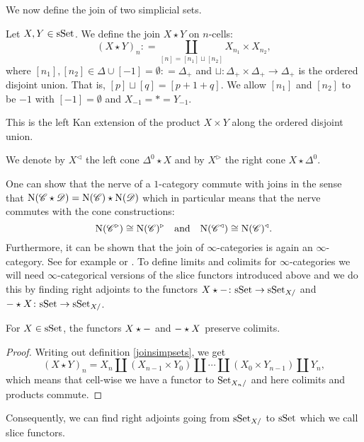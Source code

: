 \documentclass[../../thesis.tex]{subfiles}
\begin{document}
We now define the join of two simplicial sets.
\begin{definition}\label{joinsimpsets}
    Let $X, Y \in \mathrm{sSet}$.
    We define the join $X\star Y$ on $n$-cells:
    \[
        (X\star Y)_n : = \coprod_{[n] = [n_1] \sqcup [n_2]} X_{n_1} \times X_{n_2},
    \]
    where $[n_1], [n_2] \in \Delta \cup [-1] = \emptyset : = \Delta_+$ and $\sqcup: \Delta_+ \times \Delta_+ \to \Delta_+$ is the ordered disjoint union.
    That is, $[p] \sqcup [q] = [p+1+q]$.
    We allow $[n_1]$ and $[n_2]$ to be $-1$ with $[-1]=\emptyset$ and $X_{-1} = * = Y_{-1}$.
\end{definition}
\begin{remark}
    This is the left Kan extension of the product $X \times Y$ along the ordered disjoint union.
\end{remark}
\begin{example}
    We denote by $X^{\triangleleft}$ the left cone $\Delta^0 \star X$ and by $X^{\triangleright}$ the right cone $X\star \Delta^0$.
\end{example}
One can show that the nerve of a $1$-category commute with joins in the sense that $\mathrm{N}(\mathscr{C} \star \mathscr{D}) = \mathrm{N}(\mathscr{C}) \star \mathrm{N}(\mathscr{D})$ which in particular means that the nerve commutes with the cone constructions:
\[
    \mathrm{N}(\mathscr{C}^{\triangleright}) \cong \mathrm{N}(\mathscr{C})^{\triangleright}\quad \text{and} \quad\mathrm{N}(\mathscr{C}^{\triangleleft}) \cong \mathrm{N}(\mathscr{C})^{\triangleleft}.
\]
Furthermore, it can be shown that the join of $\infty$-categories is again an $\infty$-category.
See for example \cite[\href{https://kerodon.net/tag/02QV}{Corollary 02QV}]{kerodon} or \cite[Proposition 28.17.]{Rezk}.
To define limits and colimits for $\infty$-categories we will need $\infty$-categorical versions of the slice functors introduced above and we do this by finding right adjoints to the functors $X\star {-} \colon \mathrm{sSet} \to \mathrm{sSet}_{X/}$ and ${-} \star X\colon \mathrm{sSet} \to \mathrm{sSet}_{X/}$.
\begin{proposition}
    For $X\in \mathrm{sSet}$, the functors $X\star {-}$ and ${-} \star X$ preserve colimits.
\end{proposition}
\begin{proof}
    Writing out definition \ref{joinsimpsets}, we get
    \[
        (X\star Y)_n = X_n \coprod (X_{n-1} \times Y_0) \coprod \cdots \coprod (X_0 \times Y_{n-1}) \coprod Y_n,
    \]
    which means that cell-wise we have a functor to $\mathrm{Set}_{X_n/}$ and here colimits and products commute.
\end{proof}
Consequently, we can find right adjoints going from $\mathrm{sSet}_{X/}$ to $\mathrm{sSet}$ which we call slice functors.
\end{document}
